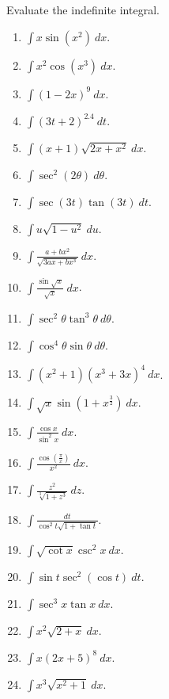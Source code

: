 \begin{problem}
Evaluate the indefinite integral.
\begin{multicols}{3}
\begin{enumerate}
\item $\displaystyle\int x \sin(x^2)~dx $.
\item $\displaystyle\int x^2\cos(x^3)~dx $.
\item $\displaystyle\int (1-2x)^9 ~dx $.
\item $\displaystyle\int (3t+2)^{2.4}~dt $.
\item $\displaystyle\int (x+1)\sqrt{2x+x^2} ~dx $.
\item $\displaystyle\int \sec^2(2\theta) ~d\theta $.
\item $\displaystyle\int \sec (3t) \tan (3t)~dt $.
\item $\displaystyle\int u\sqrt{1-u^2} ~du $.
\item $\displaystyle\int \frac{a+bx^2}{\sqrt{3ax+bx^3}}~dx $.
\item $\displaystyle\int \frac{\sin \sqrt{x}}{\sqrt{x}} ~dx $.
\item $\displaystyle\int \sec^2\theta \tan^3\theta  ~d\theta $.
\item $\displaystyle\int \cos^4\theta\sin \theta ~d\theta $.
\item $\displaystyle\int (x^2+1)(x^3+3x)^4 ~dx $.
\item $\displaystyle\int \sqrt{x}\sin (1+x^{\frac{3}{2}}) ~dx $.
\item $\displaystyle\int \frac{\cos x}{\sin^2 x} ~dx $.
\item $\displaystyle\int \frac{\cos\left(\frac{\pi}{x}\right)}{x^2} ~dx $.
\item $\displaystyle\int \frac{z^2}{\sqrt[3]{1+z^3}} ~dz $.
\item $\displaystyle\int \frac{dt}{\cos^2 t\sqrt{1+\tan t}} $.
\item $\displaystyle\int \sqrt{\cot x} \csc^2 x~dx $.
\item $\displaystyle\int \sin t \sec^2(\cos t)~dt $.
\item $\displaystyle\int \sec^3x \tan x~dx $.
\item $\displaystyle\int x^2\sqrt{2+x}~dx $.
\item $\displaystyle\int x(2x+5)^8 ~dx $.
\item $\displaystyle\int x^3\sqrt{x^2+1} ~dx $.
\end{enumerate}
\end{multicols}
\end{problem}
